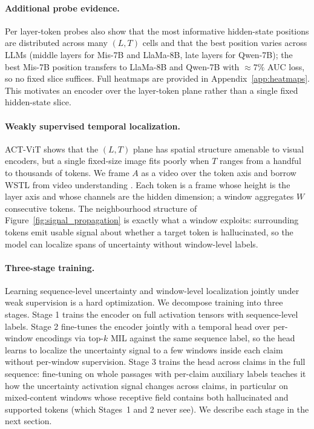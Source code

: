 


\paragraph{Additional probe evidence.} Per layer-token probes also
show that the most informative hidden-state positions are distributed
across many $(L, T)$ cells and that the best position varies across
LLMs (middle layers for Mis-7B and LlaMa-8B, late layers for Qwen-7B);
the best Mis-7B position transfers to LlaMa-8B and Qwen-7B with
$\approx 7\%$ AUC loss, so no fixed slice suffices. Full heatmaps are
provided in Appendix~\ref{app:heatmaps}. This motivates an encoder
over the layer-token plane rather than a single fixed hidden-state
slice.

\paragraph{Weakly supervised temporal localization.} ACT-ViT shows
that the $(L,T)$ plane has spatial structure amenable to visual
encoders, but a single fixed-size image fits poorly when $T$ ranges
from a handful to thousands of tokens. We frame $A$ as a video
over the token axis and borrow WSTL from video understanding
\citep{pilhyeonlee2021}. Each token is a frame whose height is the
layer axis and whose channels are the hidden dimension; a
window aggregates $W$ consecutive tokens. The neighbourhood
structure of Figure~\ref{fig:signal_propagation} is exactly what a
window exploits: surrounding tokens emit usable signal about whether
a target token is hallucinated, so the model can localize spans of
uncertainty without window-level labels.

\paragraph{Three-stage training.} Learning sequence-level uncertainty
and window-level localization jointly under weak supervision is a
hard optimization. We decompose training into three stages.
Stage 1 trains the encoder on full activation tensors with
sequence-level labels. Stage 2 fine-tunes the encoder jointly with
a temporal head \citep{albertgu2024} over per-window encodings via
top-$k$ MIL against the same sequence label, so the head learns to
localize the uncertainty signal to a few windows inside each claim
without per-window supervision.
Stage 3 trains the head across claims in the full sequence:
fine-tuning on whole passages with per-claim auxiliary labels
teaches it how the uncertainty activation signal changes across
claims, in particular on mixed-content windows whose receptive
field contains both hallucinated and supported tokens (which
Stages~1 and 2 never see). We describe each stage in the next section.
